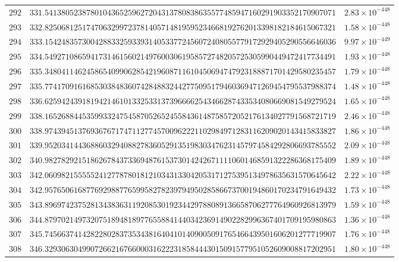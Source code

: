 \documentclass[12pt,reqno]{amsart}
\theoremstyle{remark}
\begin{document}
\begin{longtable}{clc}
$292$ & $331.5413805238780104365259627204313780838635577485947160291903352170907071$ & $2.83\times 10^{-448}$ \\
$293$ & $332.8250681251747063299723781405714819595234668192762013398182184615067321$ & $1.58\times 10^{-448}$ \\
$294$ & $333.1542483573004288332593393140533772456072408055779172929405290556646036$ & $9.97\times 10^{-449}$ \\
$295$ & $334.5492710865941731461560214976003061958572748205725305990449472417734491$ & $1.93\times 10^{-448}$ \\
$296$ & $335.3480411462458654099062854219608711610450694747923188871701429580235457$ & $1.79\times 10^{-448}$ \\
$297$ & $335.7741709161685303848360742848832442775095179460369471269454795537988374$ & $1.48\times 10^{-448}$ \\
$298$ & $336.6259424391819421461013325331373966662543466287433534080669081549279524$ & $1.65\times 10^{-448}$ \\
$299$ & $338.1652688445359933247545870526524558436148758572052176134027791568721719$ & $2.46\times 10^{-448}$ \\
$300$ & $338.9743945137693676717471127745700962221102984971283116209020143415833827$ & $1.86\times 10^{-448}$ \\
$301$ & $339.9520341443688603294088278360529135198303476231457974584292806693785552$ & $2.09\times 10^{-448}$ \\
$302$ & $340.9827829215186267843733694876153730142426711110601468591322286368175409$ & $1.89\times 10^{-448}$ \\
$303$ & $342.0609821555552412778780181210343133042053171275395134978635631570645642$ & $2.22\times 10^{-448}$ \\
$304$ & $342.9576506168776929887765995827823979495028586673700194860170234791649432$ & $1.73\times 10^{-448}$ \\
$305$ & $343.8969742375281343836311920853019234429788089136658706277764960926813979$ & $1.59\times 10^{-448}$ \\
$306$ & $344.8797021497320751894818977655884144034236914902282996367401709195980863$ & $1.36\times 10^{-448}$ \\
$307$ & $345.7456637414282280283735343816404101409005091765466439501606201277719907$ & $1.76\times 10^{-448}$ \\
$308$ & $346.3293063049907266216766000316222318584443015091577951052609008817202951$ & $1.80\times 10^{-448}$ \\

\end{longtable}
\end{document}

